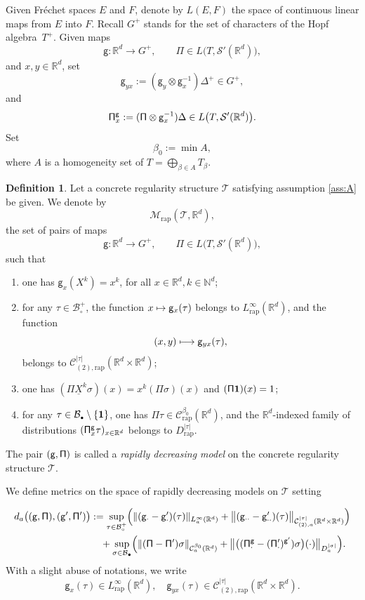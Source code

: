\documentclass[JEP,XML,SOM,Unicode,published]{cedram}
\newenvironment{enumeratea}
{\bgroup\def\theenumi{\alph{enumi}}\begin{enumerate}}
{\end{enumerate}\egroup}
\newcommand\mto{\mathchoice{\longmapsto}{\mapsto}{\mapsto}{\mapsto}}
\newcommand{\sbullet}{{\scriptscriptstyle\bullet}}
\theoremstyle{plain}
\theoremstyle{definition}
\newtheorem{defn}[thm]{Definition}
\newcommand{\rap}{\mathrm{rap}}
\newcommand{\sfg}{\mathsf{g}}
\newcommand{\sfPi}{\mathsf{\Pi}}
\newcommand{\scrM}{\mathscr{M}}
\newcommand{\scrT}{\mathscr{T}}
\newcommand{\bbN}{\mathbb{N}}
\newcommand{\bbR}{\mathbb{R}}
\newcommand{\mcB}{\mathcal{B}}
\newcommand{\mcC}{\mathcal{C}}
\newcommand\mcS{\mathcal{S}}
\begin{document}
Given Fréchet spaces $E$ and $F$, denote by $L(E,F)$ the space of continuous linear maps from $E$ into $F$. Recall $G^+$ stands for the set of characters of the Hopf algebra~$T^+$. Given maps
\[
\sfg:\bbR^d\to G^+,\qquad \sfPi\in L\bigl(T,\mcS'(\bbR^d)\bigr),
\]
and $x,y\in\bbR^d$, set
\[
\sfg_{yx} := (\sfg_y\otimes\sfg_x^{-1})\Delta^+\in G^+,
\]
and
\[
{\sf \Pi}^{\sf g}_x:=(\sfPi\otimes\sfg_x^{-1})\Delta\in L\bigl(T,\mcS'(\bbR^d)\bigr).
\]
Set
\[
\beta_0:=\min A,
\]
where $A$ is a homogeneity set of $T=\bigoplus_{\beta\in A}T_\beta$.

\begin{defn} \label{defi:weighted model}
Let a concrete regularity structure $\scrT$ satisfying assumption \eqref{ass:A} be given. We denote by
\[
\scrM_\rap(\scrT,\bbR^d),
\]
the set of pairs of maps
\[
\sfg : \bbR^d\to G^+,\qquad \sfPi\in L\bigl(T,\mcS'(\bbR^d)\bigr),
\]
such that
\begin{enumeratea}
	\item\label{defi:weighted modela} one has $\sfg_x(X^k)=x^k$, for all $x\in\bbR^d, k\in\bbN^d$;

	\item\label{defi:weighted modelb} for any $\tau\in\mcB_\circ^+$, the function $x\mto\sfg_x(\tau)$ belongs to $L_\rap^\infty(\bbR^d)$, and the function
\[
(x,y)\mto\sfg_{yx}(\tau),
\]
belongs to $\mcC_{(2),\rap}^{|\tau|}(\bbR^d\times\bbR^d)$;

	\item\label{defi:weighted modelc} one has $(\sfPi \underline{X}^k\sigma)(x)=x^k(\sfPi\sigma)(x)$ and $(\sfPi{\bf1})(x) = 1$;

	\item\label{defi:weighted modeld} for any $\tau\in\mcB_\sbullet\setminus\{{\bf1}\}$, one has $\sfPi\tau\in \mcC^{\beta_0}_\rap(\bbR^d)$, and the $\bbR^d$-indexed family of distributions $({\sf \Pi}^{\sf g}_x\tau)_{x\in\bbR^d}$ belongs to $D_\rap^{|\tau|}$.
\end{enumeratea}
The pair $\sf (g,\Pi)$ is called a \emph{rapidly decreasing model} on the concrete regularity structure $\scrT$.
\end{defn}

We define metrics on the space of rapidly decreasing models on $\scrT$ setting

\begin{align*}
d_a\bigl(({\sf g},{\sf\Pi}),({\sf g}',{\sf\Pi}')\bigr)
&:= \sup_{\tau\in\mcB_\circ^+}
\Bigl(\|({\sf g}_\cdot-{\sf g}_\cdot')(\tau)\|_{L_a^\infty(\bbR^d)}
+ \big\|({\sf g}_{\cdot\cdot}-{\sf g}_{\cdot\cdot}')(\tau)\big\|_{\mcC^{\vert\tau\vert}_{(2),a}(\bbR^d\times\bbR^d)}\Bigr)\\
&\quad+\sup_{\sigma\in\mcB_\sbullet}
\Bigl(\|({\sf\Pi}-{\sf\Pi}')\sigma\|_{\mcC^{\beta_0}_a(\bbR^d)}
+ \big\|\bigl(({\sf\Pi}_\cdot^{\sf g}-({\sf\Pi}_\cdot')^{{\sf g}'})\sigma\bigr)(\cdot) \big\|_{D^{\vert\sigma\vert}_{a}}\Bigr).
\end{align*}
With a slight abuse of notations, we write
\[
\sfg_x(\tau)\in L_\rap^\infty(\bbR^d),\quad \sfg_{yx}(\tau)\in \mcC_{(2),\rap}^{|\tau|}(\bbR^d\times\bbR^d).
\]
\end{document}

